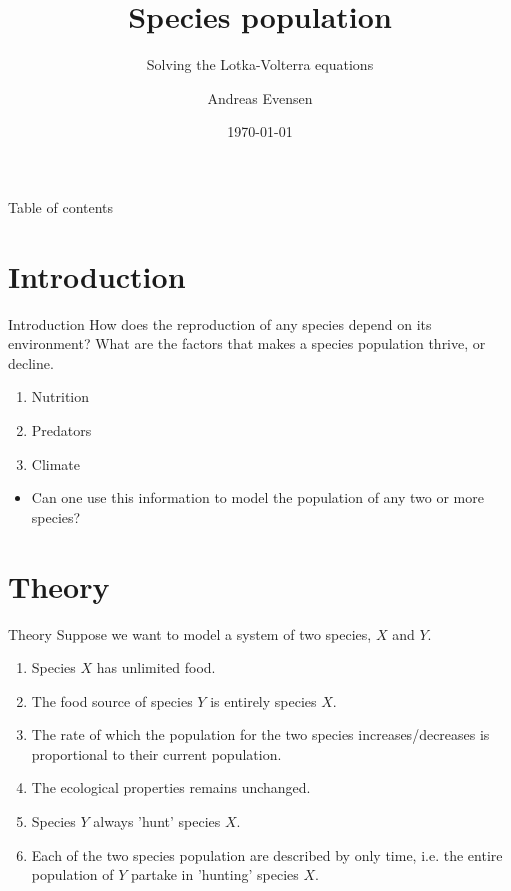 \documentclass{beamer}
\title %
{Species population}
\subtitle{Solving the Lotka-Volterra equations}
\author{Andreas Evensen}
\institute[Student] %
{
  Computational Physics\\
  Stockholm University
}
\date{\today}
\begin{document}
\frame{\titlepage}

\begin{frame}{Table of contents}
	\tableofcontents
\end{frame}

\section{Introduction}
\begin{frame}{Introduction}
	How does the reproduction of any species depend on its environment? What are the factors that makes a species population thrive, or decline.
	\begin{enumerate}
		\item<2-> Nutrition
		\item<3-> Predators
		\item<4-> Climate
	\end{enumerate}
	\begin{itemize}
		\item<5->Can one use this information to model the population of any two or more species?
	\end{itemize}
\end{frame}

\section{Theory}
\begin{frame}{Theory}
	Suppose we want to model a system of two species, $X$ and $Y$.
	\begin{enumerate}
	    \item<2-> Species $X$ has unlimited food.
	    \item<3-> The food source of species $Y$ is entirely species $X$.
	    \item<4-> The rate of which the population for the two species increases/decreases is proportional to their current population.
	    \item<5-> The ecological properties remains unchanged.
	    \item<6-> Species $Y$ always 'hunt' species $X$.
	    \item<7-> Each of the two species population are described by only time, i.e. the entire population of $Y$ partake in 'hunting' species $X$.
	\end{enumerate}
\end{frame}
\end{document}
